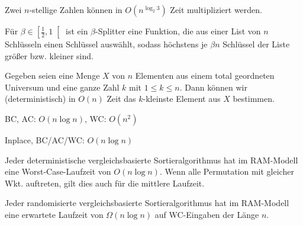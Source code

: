 \documentclass{cheat-sheet}
\begin{document}

\begin{satz}
  Zwei $n$-stellige Zahlen können in $O(n^{\log_2 3})$ Zeit multipliziert werden.
\end{satz}


\begin{defn}
  Für $\beta \in \left[ \tfrac{1}{2}, 1 \right[$ ist ein $\beta$-Splitter eine Funktion, die aus einer List von $n$ Schlüsseln einen Schlüssel auswählt, sodass höchstens je $\beta n$ Schlüssel der Liste größer bzw. kleiner sind.
\end{defn}

\begin{satz}[Selektion]
  Gegeben seien eine Menge $X$ von $n$ Elementen aus einem total geordneten Universum und eine ganze Zahl $k$ mit $1 \leq k \leq n$. Dann können wir (deterministisch) in $O(n)$ Zeit das $k$-kleinste Element aus $X$ bestimmen.
\end{satz}


\begin{alg}[Quicksort]
  BC, AC: $O(n \log n)$, WC: $O(n^2)$
\end{alg}


\begin{alg}[Heapsort]
  Inplace, BC/AC/WC: $O(n \log n)$
\end{alg}


\begin{satz}
  Jeder deterministische vergleichsbasierte Sortieralgorithmus hat im RAM-Modell eine Worst-Case-Laufzeit von $O(n \log n)$. Wenn alle Permutation mit gleicher Wkt. auftreten, gilt dies auch für die mittlere Laufzeit.
\end{satz}

\begin{satz}
  Jeder randomisierte vergleichsbasierte Sortieralgorithmus hat im RAM-Modell eine erwartete Laufzeit von $\Omega(n \log n)$ auf WC-Eingaben der Länge $n$.
\end{satz}

\end{document}
